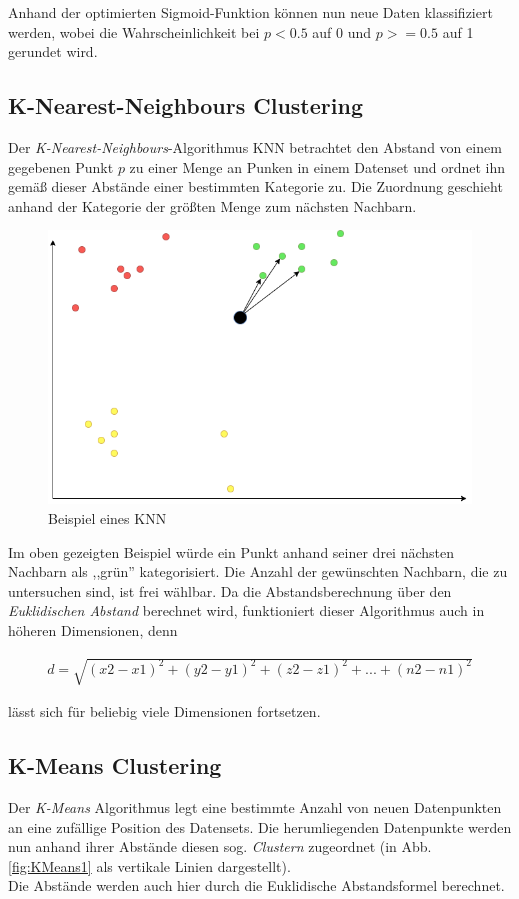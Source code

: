 Anhand der optimierten Sigmoid-Funktion können nun neue Daten klassifiziert werden, wobei die Wahrscheinlichkeit
bei $p < 0.5$ auf 0 und $p >= 0.5$ auf 1 gerundet wird.
\newpage
\subsection{K-Nearest-Neighbours Clustering}
Der \textit{K-Nearest-Neighbours}-Algorithmus KNN betrachtet den Abstand von einem gegebenen Punkt $p$ zu einer 
Menge an Punken in einem Datenset und ordnet ihn gemäß dieser Abstände einer bestimmten Kategorie zu. Die 
Zuordnung geschieht anhand der Kategorie der größten Menge zum nächsten Nachbarn.

\begin{figure}[h]
    \centering
    \includegraphics[width=12.0cm]{pic/KNN.png}
    \caption{Beispiel eines KNN}
    \label{fig:KNN}
\end{figure}

Im oben gezeigten Beispiel würde ein Punkt anhand seiner drei nächsten Nachbarn als ,,grün'' kategorisiert.
Die Anzahl der gewünschten Nachbarn, die zu untersuchen sind, ist frei wählbar.
Da die Abstandsberechnung über den \textit{Euklidischen Abstand} berechnet wird, funktioniert dieser 
Algorithmus auch in höheren Dimensionen, denn

\begin{align}
    d = \sqrt{(x2 - x1)^2 + (y2 - y1)^2 + (z2 - z1)^2 + ... + (n2 - n1)^2}
\end{align}

lässt sich für beliebig viele Dimensionen fortsetzen.

\newpage

\subsection{K-Means Clustering}
Der \textit{K-Means} Algorithmus legt eine bestimmte Anzahl von neuen Datenpunkten an eine zufällige Position des
Datensets.  Die herumliegenden Datenpunkte werden nun anhand ihrer Abstände diesen sog. \textit{Clustern} 
zugeordnet (in Abb. \ref{fig:KMeans1} als vertikale Linien dargestellt).\\
Die Abstände werden auch hier durch die Euklidische Abstandsformel berechnet.\\

